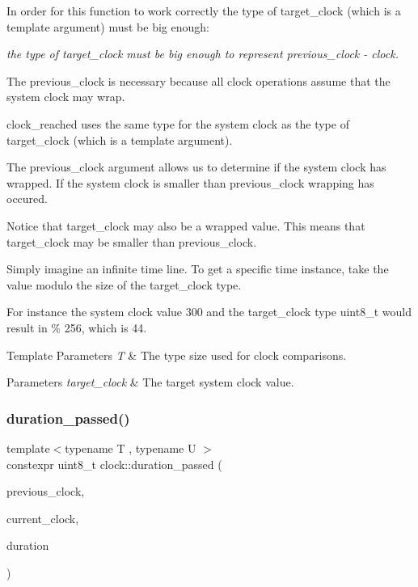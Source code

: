 In order for this function to work correctly the type of target\+\_\+clock (which is a template argument) must be big enough\+:

{\itshape the type of target\+\_\+clock must be big enough to represent {\ttfamily previous\+\_\+clock -\/ clock}.}

The previous\+\_\+clock is necessary because all clock operations assume that the system clock may wrap.

clock\+\_\+reached uses the same type for the system clock as the type of target\+\_\+clock (which is a template argument).

The previous\+\_\+clock argument allows us to determine if the system clock has wrapped. If the system clock is smaller than previous\+\_\+clock wrapping has occured.

Notice that target\+\_\+clock may also be a wrapped value. This means that target\+\_\+clock may be smaller than previous\+\_\+clock.

Simply imagine an infinite time line. To get a specific time instance, take the value modulo the size of the target\+\_\+clock type.

For instance the system clock value 300 and the target\+\_\+clock type uint8\+\_\+t would result in { \% 256}, which is 44.


\begin{DoxyTemplParams}{Template Parameters}
{\em T} & The type size used for clock comparisons. \\
\hline
\end{DoxyTemplParams}

\begin{DoxyParams}{Parameters}
{\em target\+\_\+clock} & The target system clock value. \\
\hline
\end{DoxyParams}
\hypertarget{namespaceclock_a2818f7b058e27771426f39c7aa0365cd}{}\label{namespaceclock_a2818f7b058e27771426f39c7aa0365cd} 
\subsubsection{\texorpdfstring{duration\+\_\+passed()}{duration\_passed()}\hspace{0.1cm}{\footnotesize\ttfamily [1/2]}}
{\footnotesize\ttfamily template$<$typename T , typename U $>$ \\
constexpr uint8\+\_\+t clock\+::duration\+\_\+passed (\begin{DoxyParamCaption}\item[{const T \&}]{previous\+\_\+clock,  }\item[{const T \&}]{current\+\_\+clock,  }\item[{const U \&}]{duration }\end{DoxyParamCaption})\hspace{0.3cm}{\ttfamily [inline]}}




